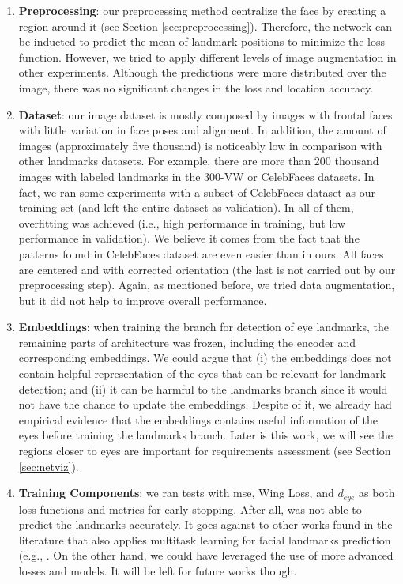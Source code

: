 \begin{enumerate}[i]
\item \textbf{Preprocessing}: our preprocessing method centralize the face by creating a region around it (see Section \ref{sec:preprocessing}). Therefore, the network can be inducted to predict the mean of landmark positions to minimize the loss function. However, we tried to apply different levels of image augmentation in other experiments. Although the predictions were more distributed over the image, there was no significant changes in the loss and location accuracy.

\item \textbf{Dataset}: our \adhoc image dataset is mostly composed by images with frontal faces with little variation in face poses and alignment. In addition, the amount of images (approximately five thousand) is noticeably low in comparison with other landmarks datasets. For example, there are more than 200 thousand images with labeled landmarks in the 300-VW \citep{tzimiropoulos2015project} or CelebFaces \citep{yang2015facial} datasets. In fact, we ran some experiments with a subset of CelebFaces dataset as our training set (and left the entire \adhoc dataset as validation). In all of them, overfitting was achieved (i.e., high performance in training, but low performance in validation). We believe it comes from the fact that the patterns found in CelebFaces dataset are even easier than in ours. All faces are centered and with corrected orientation (the last is not carried out by our preprocessing step). Again, as mentioned before, we tried data augmentation, but it did not help to improve overall performance.

\item \textbf{Embeddings}: when training the branch for detection of eye landmarks, the remaining parts of \methodname architecture was frozen, including the encoder and corresponding embeddings. We could argue that (i) the embeddings does not contain helpful representation of the eyes that can be relevant for landmark detection; and (ii) it can be harmful to the landmarks branch since it would not have the chance to update the embeddings. Despite of it, we already had empirical evidence that the embeddings contains useful information of the eyes before training the landmarks branch. Later is this work, we will see the regions closer to eyes are important for requirements assessment (see Section \ref{sec:netviz}).

\item \textbf{Training Components}: we ran tests with \acs{mse}, Wing Loss, and $d_{eye}$ as both loss functions and metrics for early stopping.  After all, \methodname was not able to predict the landmarks accurately. It goes against to other works found in the literature that also applies multitask learning for facial landmarks prediction (e.g., \citep{zhang2014facial, ranjan2017hyperface, zhang2015learning}. On the other hand, we could have leveraged the use of more advanced losses and models. It will be left for future works though.

\end{enumerate}

